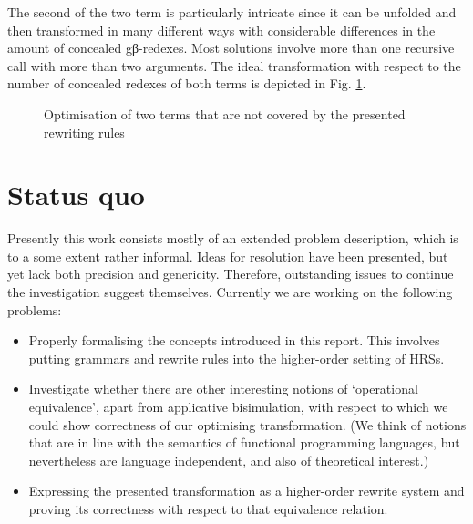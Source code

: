 \documentclass[submission,copyright,creativecommons]{eptcs}
\renewcommand\;{\,}
\begin{document}
The second of the two term is particularly intricate since it can be unfolded
and then transformed in many different ways with considerable differences in
the amount of concealed gβ-redexes. Most solutions involve more than one
recursive call with more than two arguments. The ideal transformation with respect to
the number of concealed redexes of both terms is depicted in Fig.
\ref{intricate}.

\begin{figure}[ht]

\hfill
{}

\caption{\label{intricate}Optimisation of two terms that are not covered by the presented rewriting rules}
\end{figure}







\section{Status quo}


Presently this work consists mostly of an extended problem description, which
is to a some extent rather informal. Ideas for resolution have been presented,
but yet lack both precision and genericity. Therefore, outstanding issues to
continue the investigation suggest themselves. Currently we are working on the
following problems:
\begin{itemize}
  \item Properly formalising the concepts introduced in this report. This
  involves putting grammars and rewrite rules into the higher-order setting of HRSs. 
  \item Investigate whether there are other interesting notions 
  of `operational equivalence', apart from applicative bisimulation,
  with respect to which we could show correctness of our optimising transformation.
  (We think of notions that are in line with the semantics of
   functional programming languages, but nevertheless are language independent,
   and also of theoretical interest.)
\item Expressing the presented transformation as a higher-order rewrite
  system and proving its correctness with respect to that equivalence relation.
\end{itemize}
\end{document}
